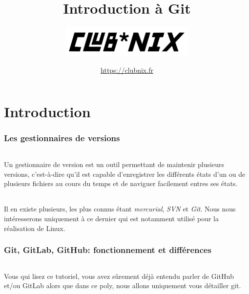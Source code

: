 \documentclass[french, a4paper, 12pt, titlepage]{article}
\begin{document}
\title{Introduction à Git}
\author{\includegraphics{clubnix}}
\date{\url{https://clubnix.fr}}

\maketitle

\vfill
\pagebreak

\newpage
\strut\thispagestyle{empty}
\vfill
\pagebreak
\tableofcontents
\strut\thispagestyle{empty}
\newpage
\setcounter{page}{1}

\part{Introduction}

\section{Les gestionnaires de versions}

\paragraph{} Un gestionnaire de version est un outil permettant de maintenir plusieurs versions, c'est-à-dire qu'il est capable d'enregistrer les différents états d'un ou de plusieurs fichiers au cours du temps et de naviguer facilement entres ses états.

\paragraph{}Il en existe plusieurs, les plus connus étant \emph{mercurial}, \emph{SVN} et \emph{Git}.  Nous nous intéresserons uniquement à ce dernier qui est notamment utilisé pour la réalisation de Linux.

\section{Git, GitLab, GitHub: fonctionnement et différences}

\paragraph{}Vous qui lisez ce tutoriel, vous avez sûrement déjà entendu parler de GitHub et/ou GitLab alors que dans ce poly, nous allons uniquement vous détailler git.
\end{document}
